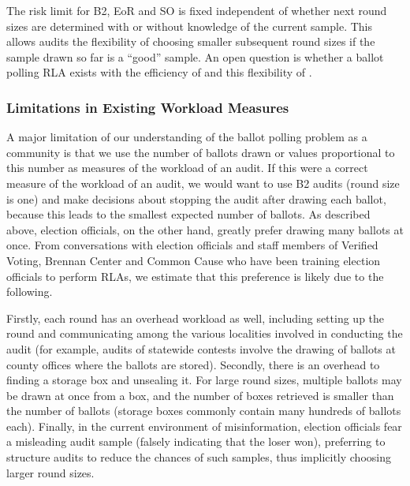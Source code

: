 The risk limit for B2, EoR and SO \BRAVO is fixed independent of whether next round sizes are determined with or without knowledge of the current sample. This allows \BRAVO audits the flexibility of choosing smaller subsequent round sizes if the sample drawn so far is a ``good'' sample. An open question is whether a ballot polling RLA exists with the efficiency of \Minerva and this flexibility of \BRAVO.

\subsubsection{Limitations in Existing Workload Measures}
A major limitation of our understanding of the ballot polling problem as a community is that we use the number of ballots drawn or values proportional to this number \cite{mclaughlin_thesis,bernhard-diss,RI-report} as measures of the workload of an audit. If this were a correct measure of the workload of an audit, we would want to use B2 audits (round size is one) and make decisions about stopping the audit after drawing each ballot, because this leads to the smallest expected number of ballots. As described above, election officials, on the other hand, greatly prefer drawing many ballots at once. From conversations with election officials and staff members of Verified Voting, Brennan Center and Common Cause who have been training election officials to perform RLAs, we estimate that this preference is likely due to the following. 

Firstly, each round has an overhead workload as well, including setting up the round and communicating among the various localities involved in conducting the audit (for example, audits of statewide contests involve the drawing of ballots at county offices where the ballots are stored). Secondly, there is an overhead to finding a storage box and unsealing it. For large round sizes, multiple ballots may be drawn at once from a box, and the number of boxes retrieved is smaller than the number of ballots (storage boxes commonly contain many hundreds of ballots each). 
Finally, in the current environment of misinformation, election officials fear a misleading audit sample (falsely indicating that the loser won), preferring to structure audits to reduce the chances of such samples, thus implicitly choosing larger round sizes. 

